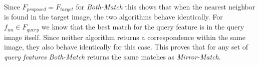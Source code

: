 \documentclass[journal]{IEEEtran}
\begin{document}
Since $F_{proposed} = F_{target}$ for \emph{Both-Match} this shows that
when the nearest neighbor is found in the target image, the two 
algorithms behave identically. For $f_{nn} \in F_{query}$ we know that 
the best match for the query feature is in the query image itself. Since 
neither algorithm returns a correspondence within the same image, they 
also behave identically for this case. This proves that for any set of 
\emph{query features} \emph{Both-Match} returns the same matches as 
\emph{Mirror-Match}.




\end{document}
